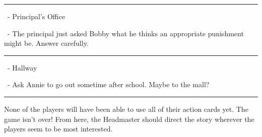 \begin{description}[topsep=0pt, labelindent=0pt, leftmargin=0.0cm]
	\rule{\textwidth}{1pt}
	
	\item[Location 5\normalfont{:}] \redsix\diamonds\ - Principal's Office
	\smallskip
	\begin{description}[labelindent = 0.5cm, leftmargin=0.75cm]
		\item[Challenge 5a\normalfont{:}] \seven\spades\ - The principal just asked Bobby what he thinks an appropriate punishment might be. Answer carefully.
	\end{description}
	
	\rule{\textwidth}{1pt}
	
	\item[Location 6\normalfont{:}] \redseven\diamonds\ - Hallway
	\smallskip
	\begin{description}[labelindent = 0.5cm, leftmargin=0.75cm]
		\item[Challenge 6a\normalfont{:}] \redten\hearts\ - Ask Annie to go out sometime after school. Maybe to the mall?
	\end{description}
	
	\rule{\textwidth}{1pt}

\end{description}
\medskip
None of the players will have been able to use all of their action cards yet. The game isn't over! From here, the Headmaster should direct the story wherever the players seem to be most interested.

